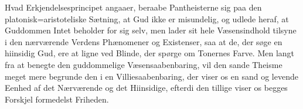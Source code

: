 \documentclass[12pt]{book}
\begin{document}
Hvad Erkjendelsesprincipet angaaer, beraabe Pantheisterne sig paa den
platonisk=aristoteliske Sætning, at Gud ikke er misundelig, og udlede heraf, at
Guddommen Intet beholder for sig selv, men lader sit hele Væsensindhold tilsyne i den
nærværende Verdens Phænomener og Existenser, saa at de, der søge en hiinsidig Gud, ere
at ligne ved Blinde, der spørge om Tonernes Farve. Men langt fra at benegte den
guddommelige Væsensaabenbaring, vil den sande Theisme meget mere begrunde den i en
Villiesaabenbaring, der viser os en sand og levende Eenhed af det Nærværende og det
Hiinsidige, efterdi den tillige viser os begges Forskjel formedelst Friheden.
\end{document}
